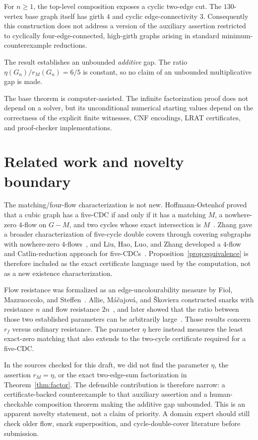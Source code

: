 \documentclass[11pt]{article}
\theoremstyle{definition}
\newcommand{\etaext}{\eta}
\begin{document}
For \(n\ge1\), the top-level composition exposes a cyclic two-edge cut.
The \(130\)-vertex base graph itself has girth \(4\) and cyclic
edge-connectivity \(3\).  Consequently this construction does not address
a version of the auxiliary assertion restricted to cyclically
four-edge-connected, high-girth graphs arising in standard
minimum-counterexample reductions.

The result establishes an unbounded \emph{additive} gap.  The ratio
\(\etaext(G_n)/r_M(G_n)=6/5\) is constant, so no claim of an unbounded
multiplicative gap is made.

The base theorem is computer-assisted.  The infinite factorization proof
does not depend on a solver, but its unconditional numerical starting
values depend on the correctness of the explicit finite witnesses, CNF
encodings, LRAT certificates, and proof-checker implementations.

\section{Related work and novelty boundary}
\label{sec:related}

The matching/four-flow characterization is not new.  Hoffmann-Ostenhof
proved that a cubic graph has a five-CDC if and only if it has a matching
\(M\), a nowhere-zero \(4\)-flow on \(G-M\), and two cycles whose exact
intersection is \(M\)~\cite[Corollary 0.6]{HoffmannOstenhof2013}.  Zhang
gave a broader characterization of five-cycle double covers through
covering subgraphs with nowhere-zero \(4\)-flows~\cite{Zhang1996}, and
Liu, Hao, Luo, and Zhang developed a \(4\)-flow and Catlin-reduction
approach for five-CDCs~\cite{LiuEtAl2023}.  Proposition~\ref{prop:equivalence}
is therefore included as the exact certificate language used by the
computation, not as a new existence characterization.

Flow resistance was formalized as an edge-uncolourability measure by
Fiol, Mazzuoccolo, and Steffen~\cite{FiolEtAl2018}.  Allie,
M\'a\v{c}ajov\'a, and \v{S}koviera constructed snarks with resistance
\(n\) and flow resistance
\(2n\)~\cite{AllieEtAl2022}, and later showed that the ratio between those
two established parameters can be arbitrarily large~\cite{AllieEtAl2024}.
Those results concern \(r_f\) versus ordinary resistance.  The parameter
\(\etaext\) here instead measures the least exact-zero matching that also
extends to the two-cycle certificate required for a five-CDC.

In the sources checked for this draft, we did not find the parameter
\(\etaext\), the assertion \(r_M=\etaext\), or the exact two-edge-sum
factorization in Theorem~\ref{thm:factor}.  The defensible contribution is
therefore narrow: a certificate-backed counterexample to that auxiliary
assertion and a human-checkable composition theorem making the additive
gap unbounded.  This is an apparent novelty statement, not a claim of
priority.  A domain expert should still check older flow, snark
superposition, and cycle-double-cover literature before submission.
\end{document}
